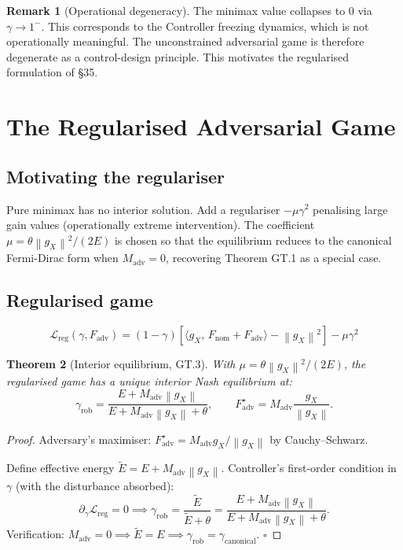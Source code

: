 \documentclass[11pt,a4paper]{article}
\newtheorem{theorem}{Theorem}[section]
\theoremstyle{definition}
\newtheorem{remark}[theorem]{Remark}
\newcommand{\norm}[1]{\left\|#1\right\|}
\newcommand{\inner}[2]{\langle #1,\,#2\rangle}
\newcommand{\gX}{g_X}
\newcommand{\adv}{\mathrm{adv}}
\newcommand{\nom}{\mathrm{nom}}
\newcommand{\rob}{\mathrm{rob}}
\begin{document}
\begin{remark}[Operational degeneracy]
The minimax value collapses to $0$ via $\gamma \to 1^-$. This corresponds to the Controller freezing dynamics, which is not operationally meaningful. The unconstrained adversarial game is therefore degenerate as a control-design principle. This motivates the regularised formulation of \S35.
\end{remark}

\section{The Regularised Adversarial Game}

\subsection{Motivating the regulariser}

Pure minimax has no interior solution. Add a regulariser $-\mu\gamma^2$ penalising large gain values
(operationally extreme intervention). The coefficient $\mu = \theta\norm{\gX}^2/(2E)$ is chosen so that
the equilibrium reduces to the canonical Fermi-Dirac form when $M_\adv = 0$, recovering Theorem GT.1
as a special case.

\subsection{Regularised game}

\[
\mathcal{L}_\text{reg}(\gamma, F_\adv) = (1-\gamma)\left[\inner{\gX}{F_\nom + F_\adv} - \norm{\gX}^2\right] - \mu\gamma^2
\]

\begin{theorem}[Interior equilibrium, GT.3]
With $\mu = \theta\norm{\gX}^2/(2E)$, the regularised game has a unique interior Nash equilibrium at:
\[
\gamma_\rob = \frac{E + M_\adv\norm{\gX}}{E + M_\adv\norm{\gX} + \theta},
\qquad
F_\adv^\star = M_\adv\frac{\gX}{\norm{\gX}}.
\]
\end{theorem}

\begin{proof}
Adversary's maximiser: $F_\adv^\star = M_\adv\gX/\norm{\gX}$ by Cauchy--Schwarz.

Define effective energy $\tilde E = E + M_\adv\norm{\gX}$.
Controller's first-order condition in $\gamma$ (with the disturbance absorbed):
\[
\partial_\gamma\mathcal{L}_\text{reg} = 0 \implies \gamma_\rob = \frac{\tilde E}{\tilde E + \theta} = \frac{E + M_\adv\norm{\gX}}{E + M_\adv\norm{\gX} + \theta}.
\]
Verification: $M_\adv = 0 \implies \tilde E = E \implies \gamma_\rob = \gamma_\text{canonical}$. $\square$
\end{proof}
\end{document}
